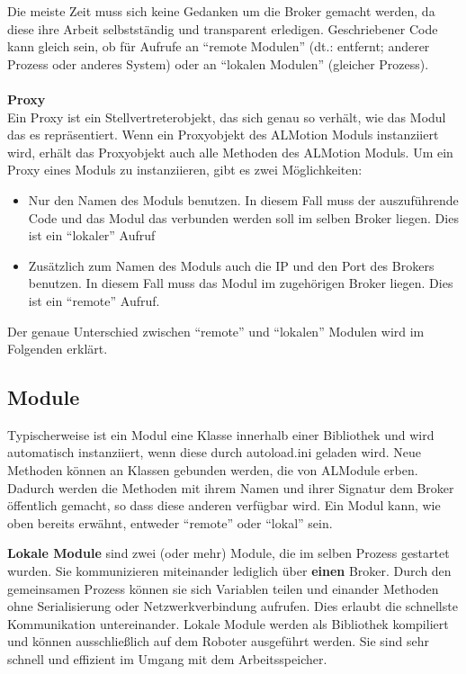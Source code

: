 Die meiste Zeit muss sich keine Gedanken um die Broker gemacht werden, da diese ihre Arbeit selbstständig und transparent erledigen. Geschriebener Code kann gleich sein, ob für Aufrufe an "`remote Modulen"' (dt.: entfernt; anderer Prozess oder anderes System) oder an "`lokalen Modulen"' (gleicher Prozess).
\\
\\
\textbf{Proxy}
\\
Ein Proxy ist ein Stellvertreterobjekt, das sich genau so verhält, wie das Modul das es repräsentiert. Wenn ein Proxyobjekt des ALMotion Moduls instanziiert wird, erhält das Proxyobjekt auch alle Methoden des \textsf{ALMotion} Moduls.
\newline
\newline
Um ein Proxy eines Moduls zu instanziieren, gibt es zwei Möglichkeiten: 
\begin{itemize}
\item Nur den Namen des Moduls benutzen. In diesem Fall muss der auszuführende Code und das Modul das verbunden werden soll im selben Broker liegen. Dies ist ein "`lokaler"' Aufruf
\item Zusätzlich zum Namen des Moduls auch die IP und den Port des Brokers benutzen. In diesem Fall muss das Modul im zugehörigen Broker liegen. Dies ist ein "`remote"' Aufruf.
\end{itemize}
Der genaue Unterschied zwischen "`remote"' und "`lokalen"' Modulen wird im Folgenden erklärt.
\\
\subsection{Module}
Typischerweise ist ein Modul eine Klasse innerhalb einer Bibliothek und wird automatisch instanziiert, wenn diese  durch \textsf{autoload.ini} geladen wird. Neue Methoden können an Klassen gebunden werden, die von \textsf{ALModule} erben. Dadurch werden die Methoden mit ihrem Namen und ihrer Signatur dem Broker öffentlich gemacht, so dass diese anderen verfügbar wird.
Ein Modul kann, wie oben bereits erwähnt, entweder "`remote"' oder "`lokal"' sein. 

\textbf{Lokale Module } sind zwei (oder mehr) Module, die im selben Prozess gestartet wurden. Sie kommunizieren miteinander lediglich über \textbf{einen} Broker. Durch den gemeinsamen Prozess können sie sich  Variablen teilen und einander Methoden ohne Serialisierung oder Netzwerkverbindung aufrufen. Dies erlaubt die schnellste Kommunikation untereinander. Lokale Module werden als Bibliothek kompiliert und können ausschließlich auf dem Roboter ausgeführt werden. Sie sind sehr schnell und effizient im Umgang mit dem Arbeitsspeicher.

